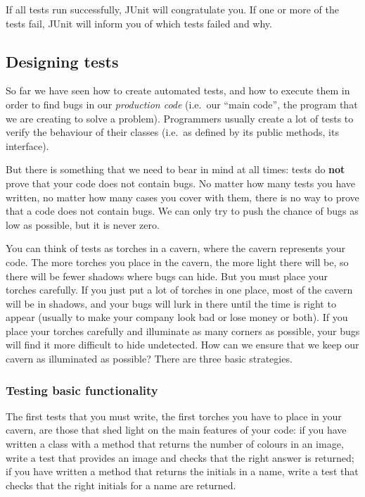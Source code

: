 If all tests run successfully, JUnit will congratulate you. If one or
more of the tests fail, JUnit will inform you of which tests failed
and why. 

\subsection{Designing tests}
\label{sec:designing-tests}

So far we have seen how to create automated tests, and how to execute
them in order to find bugs in our \emph{production code} (i.e.~our
``main code'', the program that we are creating to solve a
problem). Programmers usually create a lot of tests to verify the
behaviour of their classes (i.e.~as defined by its public methods, its
interface). 

But there is something that we need to bear in mind at all
times: tests do \textbf{not} prove that your code does not contain
bugs. No matter how many tests you have written, no matter how many
cases you cover with them, there is no way to prove that a code does
not contain bugs. We can only try to push the chance of bugs as low as
possible, but it is never zero.

You can think of tests as torches in a cavern, where the cavern
represents your code. The more
torches you place in the cavern, the more light there will be, so there
will be fewer shadows where bugs can hide. But you must place your
torches carefully. If you just put a lot of torches in one place, most
of the cavern will be in shadows, and your bugs will lurk in there until
the time is right to appear (usually to make your company look bad or
lose money or both). If you place your torches carefully and
illuminate as many corners as possible, your bugs will find it more
difficult to hide undetected. How can we ensure that we keep our
cavern as illuminated as possible? There are three basic strategies.

\subsubsection{Testing basic functionality}
\label{sec:test-basic-funct}

The first tests that you must write, the first torches you have to
place in your cavern, are those that shed light on the main features
of your code: if you have written a class with a method that returns
the number of colours in an image, write a test that provides an image
and checks that the right answer is returned; if you have written a
method that returns the initials in a name, write a test that checks
that the right initials for a name are returned. 

